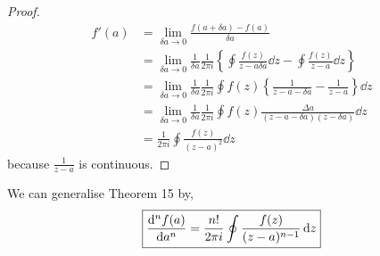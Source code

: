\documentclass{book}
\begin{document}
\begin{proof}
	\begin{align}
		f'(a) & = \lim_{\delta a \to 0}\frac{f(a + \delta a) - f(a)}{\delta a} \\
		&  =\lim_{\delta a \to 0} \frac{1}{\delta a}\frac{1}{2\pi i}\left\{\oint\frac{f(z)}{z - a\delta a}\dd{z} - \oint \frac{f(z)}{z - a}\dd{z}\right\} \\
		& = \lim_{\delta a \to 0} \frac{1}{\delta a}\frac{1}{2\pi i}\oint f(z) \left\{\frac{1}{z - a - \delta a} - \frac{1}{z - a}\right\}\dd{z} \\
		& = \lim_{\delta a \to 0} \frac{1}{\delta a}\frac{1}{2\pi i} \oint f(z) \frac{\Delta a }{(z - a - \delta a)(z - \delta a)}\dd{z} \\
		& = \frac{1}{2\pi i} \oint\frac{f(z)}{(z - a)^2}\dd{z}
	\end{align}
	because $\frac{1}{z-a}$ is continuous.
\end{proof}
We can generalise Theorem 15 by,
\begin{equation}
	\boxed{\dv[n]{f(a)}{a} = \frac{n!}{2\pi i }\oint \frac{f(z)}{(z - a)^{n-1}}\dd{z}}
\end{equation}
\end{document}
